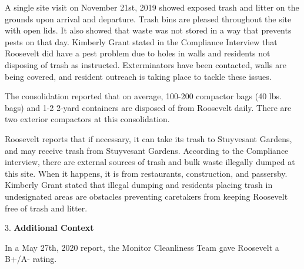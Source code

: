 A single site visit on November 21st, 2019 showed exposed trash and litter on the grounds upon arrival and departure. Trash bins are pleased throughout the site with open lids. It also showed that waste was not stored in a way that prevents pests on that day. Kimberly Grant stated in the Compliance Interview that Roosevelt did have a pest problem due to holes in walls and residents not disposing of trash as instructed. Exterminators have been contacted, walls are being covered, and resident outreach is taking place to tackle these issues.

The consolidation reported that on average, 100-200 compactor bags (40 lbs. bags) and 1-2 2-yard containers are disposed of from Roosevelt daily. There are two exterior compactors at this consolidation.

Roosevelt reports that if necessary, it can take its trash to Stuyvesant Gardens, and may receive trash from Stuyvesant Gardens. According to the Compliance interview, there are external sources of trash and bulk waste illegally dumped at this site. When it happens, it is from restaurants, construction, and passersby. Kimberly Grant stated that illegal dumping and residents placing trash in undesignated areas are obstacles preventing caretakers from keeping Roosevelt free of trash and litter.

3. \textbf{Additional Context} 

In a May 27th, 2020 report, the Monitor Cleanliness Team gave Roosevelt a B+/A- rating. 